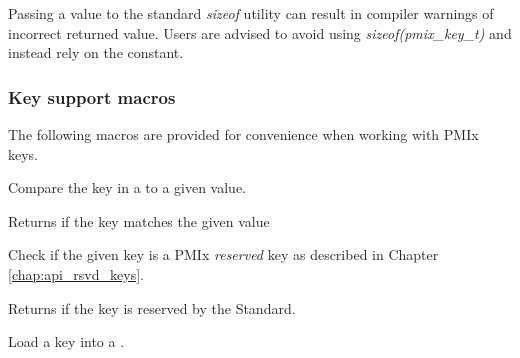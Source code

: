 Passing a  value to the standard \textit{sizeof} utility can result in compiler warnings of incorrect returned value. Users are advised to avoid using \textit{sizeof(pmix_key_t)} and instead rely on the  constant.
\adviceuserend

\subsubsection{Key support macros}

The following macros are provided for convenience when working with \ac{PMIx} keys.


Compare the key in a  to a given value.


\begin{arglist}
\end{arglist}

Returns  if the key matches the given value


Check if the given key is a \ac{PMIx} \emph{reserved} key as described in Chapter \ref{chap:api_rsvd_keys}.


\begin{arglist}
\end{arglist}

Returns  if the key is reserved by the Standard.


Load a key into a .


\begin{arglist}
\end{arglist}

